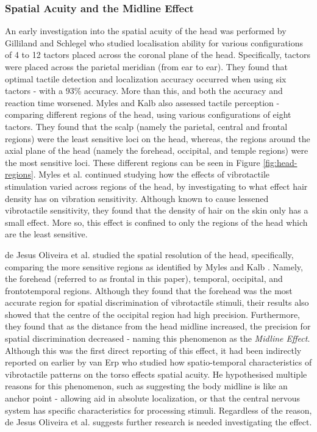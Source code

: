 \documentclass{mpaper}
\begin{document}
\subsubsection{Spatial Acuity and the Midline Effect}
An early investigation into the spatial acuity of the head was performed by Gilliland and Schlegel \cite{doi:10.1177/001872089403600410} who studied localisation ability for various configurations of 4 to 12 tactors placed across the coronal plane of the head. Specifically, tactors were placed across the parietal meridian (from ear to ear). They found that optimal tactile detection and localization accuracy occurred when using six tactors - with a 93\% accuracy. More than this, and both the accuracy and reaction time worsened. Myles and Kalb \cite{headguidelines} also assessed tactile perception - comparing different regions of the head, using various configurations of eight tactors. They found that the scalp (namely the parietal, central and frontal regions) were the least sensitive loci on the head, whereas, the regions around the axial plane of the head (namely the forehead, occipital, and temple regions) were the most sensitive loci. These different regions can be seen in Figure \ref{fig:head-regions}. Myles et al. \cite{MYLES2015177} continued studying how the effects of vibrotactile stimulation varied across regions of the head, by investigating to what effect hair density has on vibration sensitivity. Although known to cause lessened vibrotactile sensitivity, they found that the density of hair on the skin only has a small effect. More so, this effect is confined to only the regions of the head which are the least sensitive.

de Jesus Oliveira et al. \cite{7463147} studied the spatial resolution of the head, specifically, comparing the more sensitive regions as identified by Myles and Kalb \cite{headguidelines}. Namely, the forehead (referred to as frontal in this paper), temporal, occipital, and frontotemporal regions. Although they found that the forehead was the most accurate region for spatial discrimination of vibrotactile stimuli, their results also showed that the centre of the occipital region had high precision. Furthermore, they found that as the distance from the head midline increased, the precision for spatial discrimination decreased - naming this phenomenon as the \textit{Midline Effect}. Although this was the first direct reporting of this effect, it had been indirectly reported on earlier by van Erp \cite{1406917} who studied how spatio-temporal characteristics of vibrotactile patterns on the torso effects spatial acuity. He hypothesised multiple reasons for this phenomenon, such as suggesting the body midline is like an anchor point - allowing aid in absolute localization, or that the central nervous system has specific characteristics for processing stimuli. Regardless of the reason, de Jesus Oliveira et al. suggests further research is needed investigating the effect.
\end{document}
